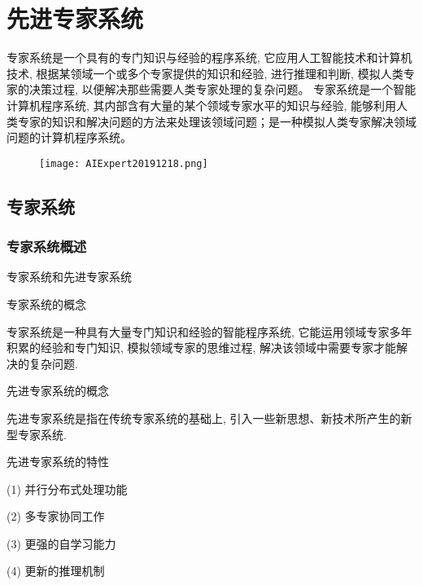 \chapter{先进专家系统}\label{AIChapter10}
\begin{tcolorbox}[colback=white!50,colframe=orange!50,title=专家系统]
\begin{center}
专家系统是一个具有的专门知识与经验的程序系统, 它应用人工智能技术和计算机技术, 根据某领域一个或多个专家提供的知识和经验, 进行推理和判断, 模拟人类专家的决策过程, 以便解决那些需要人类专家处理的复杂问题。
专家系统是一个智能计算机程序系统, 其内部含有大量的某个领域专家水平的知识与经验, 能够利用人类专家的知识和解决问题的方法来处理该领域问题；是一种模拟人类专家解决领域问题的计算机程序系统。
\hfill
\end{center}
\end{tcolorbox}

\begin{figure}[H]
\centering
\texttt{[image: AIExpert20191218.png]}
\label{AIExpert20191218}
\end{figure}

\section{专家系统}
\subsection{专家系统概述}
专家系统和先进专家系统

专家系统的概念

    专家系统是一种具有大量专门知识和经验的智能程序系统, 它能运用领域专家多年积累的经验和专门知识, 模拟领域专家的思维过程, 解决该领域中需要专家才能解决的复杂问题.

先进专家系统的概念

    先进专家系统是指在传统专家系统的基础上, 引入一些新思想、新技术所产生的新型专家系统.

先进专家系统的特性

    (1) 并行分布式处理功能

    (2) 多专家协同工作

    (3) 更强的自学习能力

    (4) 更新的推理机制

